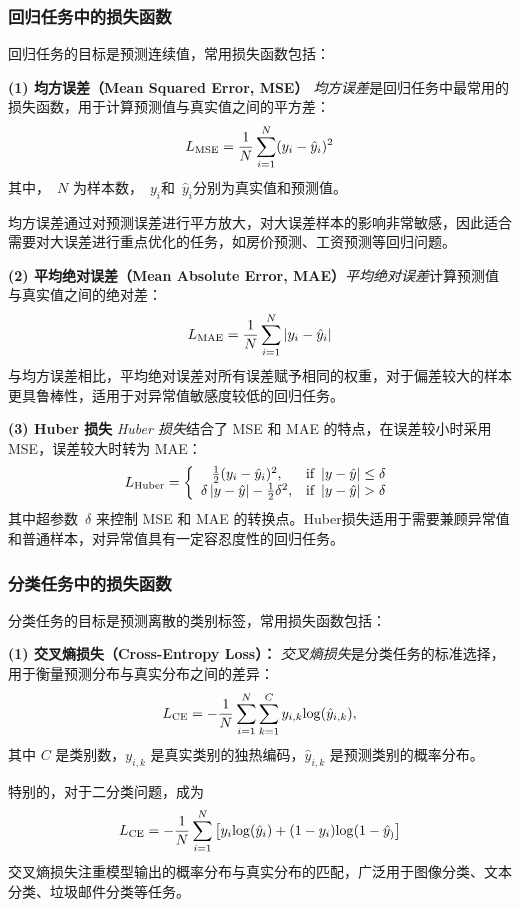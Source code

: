 \subsubsection*{回归任务中的损失函数}
回归任务的目标是预测连续值，常用损失函数包括：

{\bf (1) 均方误差（Mean Squared Error, MSE）}
{\em 均方误差}是回归任务中最常用的损失函数，用于计算预测值与真实值之间的平方差：
$$
L_{\rm MSE}= \frac{1}{N}\sum_{i=1}^N (y_i-\hat{y}_i)^2
$$
其中，~$N$ 为样本数，~$y_i$和~$\hat{y}_i$分别为真实值和预测值。

均方误差通过对预测误差进行平方放大，对大误差样本的影响非常敏感，因此适合需要对大误差进行重点优化的任务，如房价预测、工资预测等回归问题。

{\bf (2) 平均绝对误差（Mean Absolute Error, MAE）}{\em 平均绝对误差}计算预测值与真实值之间的绝对差：
$$
L_{\rm MAE}= \frac{1}{N}\sum_{i=1}^N \left| {y_i-\hat{y}_i} \right|
$$
与均方误差相比，平均绝对误差对所有误差赋予相同的权重，对于偏差较大的样本更具鲁棒性，适用于对异常值敏感度较低的回归任务。

{\bf (3) Huber 损失} {\em Huber 损失}结合了 MSE 和 MAE 的特点，在误差较小时采用 MSE，误差较大时转为 MAE：
 $$
L_{\rm Huber}= \left\{ 
\begin{array}{cl} 
\frac{1}{2} (y_i-\hat{y}_i)^2, & \mbox{if }  \left| {y-\hat{y}} \right|\le \delta \\
  \delta \left|{y-\hat{y}} \right|-\frac{1}{2}\delta^2, &  \mbox{if } \left| {y-\hat{y}} \right|> \delta
\end{array}
\right.
$$
其中超参数~$\delta$  来控制 MSE 和 MAE 的转换点。Huber损失适用于需要兼顾异常值和普通样本，对异常值具有一定容忍度性的回归任务。

\subsubsection*{分类任务中的损失函数}

分类任务的目标是预测离散的类别标签，常用损失函数包括：

{\bf (1) 交叉熵损失（Cross-Entropy Loss）：} 
{\em 交叉熵损失}是分类任务的标准选择，用于衡量预测分布与真实分布之间的差异：
\begin{equation}\label{eq}
L_{\rm CE}=-\frac{1}{N}\sum_{i=1}^N\sum_{k=1}^C y_{i,k} {\rm log}(\hat{y}_{i,k}),
\end{equation}
其中 $C$ 是类别数，$y_{i,k}$ 是真实类别的独热编码，$\hat{y}_{i,k}$ 是预测类别的概率分布。

特别的，对于二分类问题，成为
$$
L_{\rm CE} =-\frac{1}{N}\sum_{i=1}^N \left[  y_i {\rm log}(\hat{y}_i) +(1-y_i){\rm log}(1-\hat{y}_)\right]
$$
交叉熵损失注重模型输出的概率分布与真实分布的匹配，广泛用于图像分类、文本分类、垃圾邮件分类等任务。


